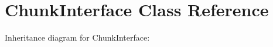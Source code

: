 \hypertarget{classChunkInterface}{}\section{Chunk\+Interface Class Reference}
\label{classChunkInterface}


Inheritance diagram for Chunk\+Interface\+:
